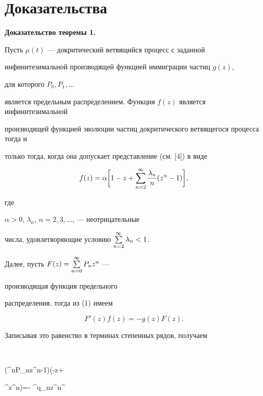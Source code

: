 \section{Доказательства}





{\bf Доказательство теоремы 1.}


Пусть $\mu (t)$ --- докритический ветвящийся процесс с заданной


инфинитезимальной производящей функцией иммиграции частиц $g(z)$,


для которого $P_0, P_1, \dotsc $


является предельным распределением. Функция $f(z)$ является инфинитезимальной 


производящей функцией эволюции частиц докритического ветвящегося процесса тогда и 


только тогда, когда она допускает представление (см. [4]) в виде


\begin{equation}


f(z)=\alpha \bigg[1-z+\Su {n=2}^{\infty }\frac {\lambda_n}{n}


(z^n-1)\bigg],


\end{equation}


где


$\alpha >0$, $\lambda_n$, $n=2, 3, \dotsc$, --- неотрицательные


числа, удовлетворяющие условию $\sum \limits_ {n=2}^{\infty }\lambda_n<1$.





Далее, пусть $F(z)=\sum \limits_ {n=0}^{\infty }P_nz^n$ ---


производящая функция предельного


распределения, тогда из (1) имеем


\begin{equation}


F'(z)f(z)=-g(z)F(z).


\end{equation}


Записывая это равенство в терминах степенных рядов, получаем


$$


\alpha \bigg(^{\infty }nP_nz^{n-1}\bigg)\bigg(\sigma -z+


^{\infty }z^n\bigg)=- ^{\infty }q_nz^n^


